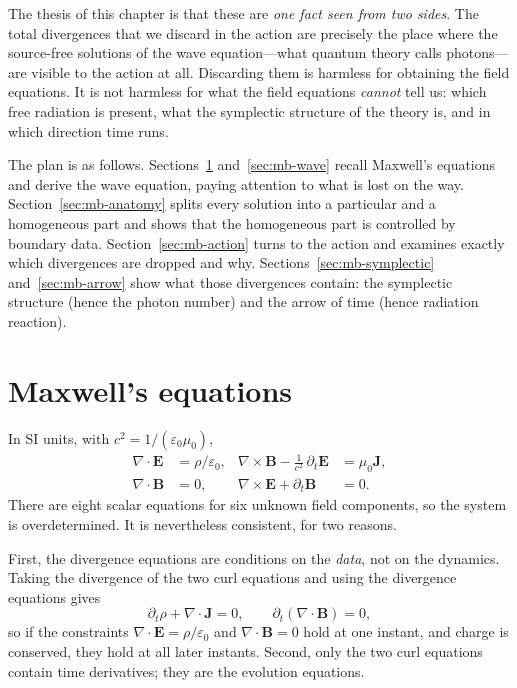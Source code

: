 The thesis of this chapter is that these are \emph{one fact seen from two
sides}. The total divergences that we discard in the action are precisely
the place where the source-free solutions of the wave equation---what
quantum theory calls photons---are visible to the action at all. Discarding
them is harmless for obtaining the field equations. It is not harmless for
what the field equations \emph{cannot} tell us: which free radiation is
present, what the symplectic structure of the theory is, and in which
direction time runs.

The plan is as follows. Sections~\ref{sec:mb-maxwell} and~\ref{sec:mb-wave}
recall Maxwell's equations and derive the wave equation, paying attention
to what is lost on the way. Section~\ref{sec:mb-anatomy} splits every
solution into a particular and a homogeneous part and shows that the
homogeneous part is controlled by boundary data. Section~\ref{sec:mb-action}
turns to the action and examines exactly which divergences are dropped and
why. Sections~\ref{sec:mb-symplectic} and~\ref{sec:mb-arrow} show what
those divergences contain: the symplectic structure (hence the photon
number) and the arrow of time (hence radiation reaction).

\section{Maxwell's equations}
\label{sec:mb-maxwell}

In SI units, with $c^2=1/(\varepsilon_0\mu_0)$,
\begin{align}
\nabla\cdot\mathbf E &= \rho/\varepsilon_0, &
\nabla\times\mathbf B-\frac1{c^2}\,\partial_t\mathbf E &= \mu_0\mathbf J,
\label{eq:mb-max-a}\\
\nabla\cdot\mathbf B &= 0, &
\nabla\times\mathbf E+\partial_t\mathbf B &= 0 .
\label{eq:mb-max-b}
\end{align}
There are eight scalar equations for six unknown field components, so the
system is overdetermined. It is nevertheless consistent, for two reasons.

First, the divergence equations are conditions on the \emph{data}, not on
the dynamics. Taking the divergence of the two curl equations and using
the divergence equations gives
\begin{equation}
\partial_t\rho+\nabla\cdot\mathbf J=0,\qquad
\partial_t(\nabla\cdot\mathbf B)=0,
\label{eq:mb-consistency}
\end{equation}
so if the constraints $\nabla\cdot\mathbf E=\rho/\varepsilon_0$ and
$\nabla\cdot\mathbf B=0$ hold at one instant, and charge is conserved, they
hold at all later instants. Second, only the two curl equations contain time
derivatives; they are the evolution equations.

